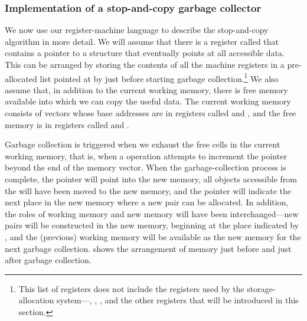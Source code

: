 \subsubsection*{Implementation of a stop-and-copy garbage collector}

We now use our register-machine language to describe the stop-and-copy
algorithm in more detail.  We will assume that there is a register called
 that contains a pointer to a structure that eventually points at
all accessible data.  This can be arranged by storing the contents of all the
machine registers in a pre-allocated list pointed at by  just before
starting garbage collection.\footnote{This list of registers does not include
the registers used by the storage-allocation system---,
, , and the other registers that will be
introduced in this section.} We also assume that, in addition to the current
working memory, there is free memory available into which we can copy the
useful data.  The current working memory consists of vectors whose base
addresses are in registers called  and , and the
free memory is in registers called  and .

Garbage collection is triggered when we exhaust the free cells in the current
working memory, that is, when a  operation attempts to increment the
 pointer beyond the end of the memory vector.  When the
garbage-collection process is complete, the  pointer will point into
the new memory, all objects accessible from the  will have been
moved to the new memory, and the  pointer will indicate the next
place in the new memory where a new pair can be allocated.  In addition, the
roles of working memory and new memory will have been interchanged---new pairs
will be constructed in the new memory, beginning at the place indicated by
, and the (previous) working memory will be available as the new
memory for the next garbage collection.   shows the
arrangement of memory just before and just after garbage collection.

